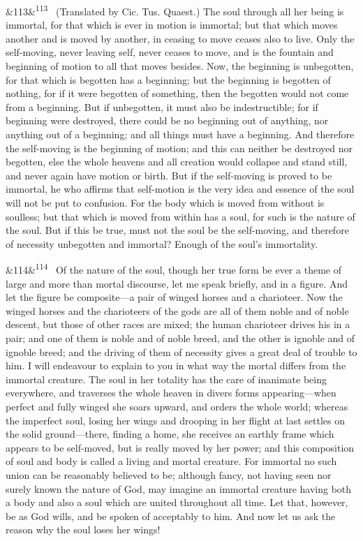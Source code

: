 \documentclass[12pt]{article}
\newcommand{\para}[1][]{\par\noindent\ifx&#1&\else\textsuperscript{\footnotesize #1}~\fi}
\begin{document}
\para[113] (Translated by Cic. Tus. Quaest.) The soul through all her being is immortal, for that which is ever in motion is immortal; but that which moves another and is moved by another, in ceasing to move ceases also to live. Only the self-moving, never leaving self, never ceases to move, and is the fountain and beginning of motion to all that moves besides. Now, the beginning is unbegotten, for that which is begotten has a beginning; but the beginning is begotten of nothing, for if it were begotten of something, then the begotten would not come from a beginning. But if unbegotten, it must also be indestructible; for if beginning were destroyed, there could be no beginning out of anything, nor anything out of a beginning; and all things must have a beginning. And therefore the self-moving is the beginning of motion; and this can neither be destroyed nor begotten, else the whole heavens and all creation would collapse and stand still, and never again have motion or birth. But if the self-moving is proved to be immortal, he who affirms that self-motion is the very idea and essence of the soul will not be put to confusion. For the body which is moved from without is soulless; but that which is moved from within has a soul, for such is the nature of the soul. But if this be true, must not the soul be the self-moving, and therefore of necessity unbegotten and immortal? Enough of the soul's immortality.

\para[114] Of the nature of the soul, though her true form be ever a theme of large and more than mortal discourse, let me speak briefly, and in a figure. And let the figure be composite---a pair of winged horses and a charioteer. Now the winged horses and the charioteers of the gods are all of them noble and of noble descent, but those of other races are mixed; the human charioteer drives his in a pair; and one of them is noble and of noble breed, and the other is ignoble and of ignoble breed; and the driving of them of necessity gives a great deal of trouble to him. I will endeavour to explain to you in what way the mortal differs from the immortal creature. The soul in her totality has the care of inanimate being everywhere, and traverses the whole heaven in divers forms appearing---when perfect and fully winged she soars upward, and orders the whole world; whereas the imperfect soul, losing her wings and drooping in her flight at last settles on the solid ground---there, finding a home, she receives an earthly frame which appears to be self-moved, but is really moved by her power; and this composition of soul and body is called a living and mortal creature. For immortal no such union can be reasonably believed to be; although fancy, not having seen nor surely known the nature of God, may imagine an immortal creature having both a body and also a soul which are united throughout all time. Let that, however, be as God wills, and be spoken of acceptably to him. And now let us ask the reason why the soul loses her wings!
\end{document}

